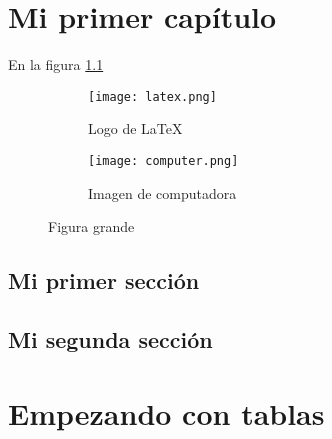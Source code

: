 \documentclass[12pt]{report}
\begin{document}
	\maketitle
	\tableofcontents
	
	\chapter{Mi primer capítulo}
		
		En la figura \ref{fig:latex-logo}
		\lipsum[1][1-11]
	
		\begin{figure}[h]
			\centering
			\begin{subfigure}{0.4\textwidth}
				\centering
				\texttt{[image: latex.png]}
				\caption{Logo de \LaTeX}
				\label{fig:latex-logo}
			\end{subfigure}
			\hfill
			\begin{subfigure}{0.4\textwidth}
				\centering
				\texttt{[image: computer.png]}
				\caption{Imagen de computadora}
				\label{fig:computer-image}
			\end{subfigure}
			\caption{Figura grande}
			\label{fig:grande}
		\end{figure}
		
		\section{Mi primer sección}
			\lipsum[1-2]
			\lipsum[1][1-3]
		
		\section{Mi segunda sección}
			\lipsum[3-5]
	\chapter{Empezando con tablas}
		
\end{document}
